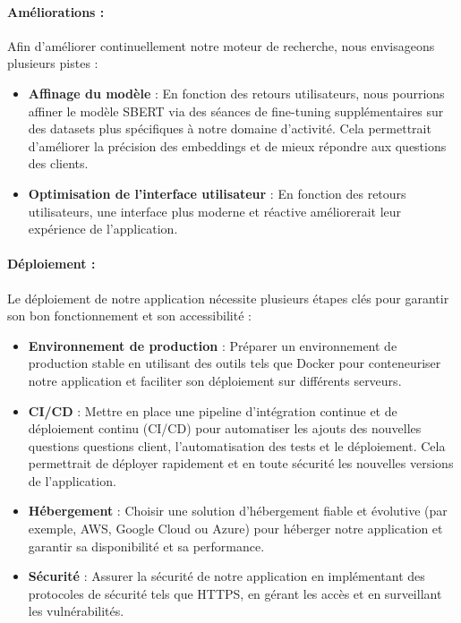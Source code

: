 \documentclass[12pt]{article}
\theoremstyle{definition}
\begin{document}
\paragraph{Améliorations :}

Afin d'améliorer continuellement notre moteur de recherche, nous envisageons plusieurs pistes :

\begin{itemize}
	\item \textbf{Affinage du modèle} : En fonction des retours utilisateurs, nous pourrions affiner le modèle SBERT via des séances de fine-tuning supplémentaires sur des datasets plus spécifiques à notre domaine d'activité. Cela permettrait d'améliorer la précision des embeddings et de mieux répondre aux questions des clients.
	\item \textbf{Optimisation de l'interface utilisateur} : En fonction des retours utilisateurs, une interface plus moderne et réactive améliorerait leur expérience de l'application.

\end{itemize}

\paragraph{Déploiement :}

Le déploiement de notre application nécessite plusieurs étapes clés pour garantir son bon fonctionnement et son accessibilité :

\begin{itemize}
	\item \textbf{Environnement de production} : Préparer un environnement de production stable en utilisant des outils tels que Docker pour conteneuriser notre application et faciliter son déploiement sur différents serveurs.
	\item \textbf{CI/CD} : Mettre en place une pipeline d'intégration continue et de déploiement continu (CI/CD) pour automatiser les ajouts des nouvelles questions questions client, l'automatisation des tests et le déploiement. Cela permettrait de déployer rapidement et en toute sécurité les nouvelles versions de l'application.
	\item \textbf{Hébergement} : Choisir une solution d'hébergement fiable et évolutive (par exemple, AWS, Google Cloud ou Azure) pour héberger notre application et garantir sa disponibilité et sa performance.
	\item \textbf{Sécurité} : Assurer la sécurité de notre application en implémentant des protocoles de sécurité tels que HTTPS, en gérant les accès et en surveillant les vulnérabilités.
\end{itemize}
\end{document}
